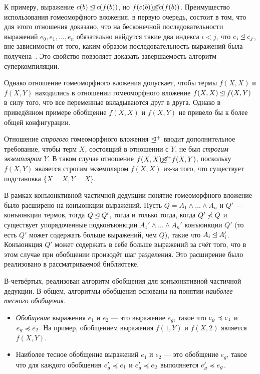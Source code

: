 К примеру, выражение $c(b) \unlhd c(f(b))$, но $f(c(b)) \cancel{\unlhd} c(f(b))$.
Преимущество использования гомеоморфного вложения, в первую очередь, состоит в том,
что для этого отношения доказано, что на бесконечной последовательности выражений $e_0, e_1, \dots, e_n$
обязательно найдутся такие два индекса $i < j$, что $e_i \unlhd e_j$, вне зависимости
от того, каким образом последовательность выражений была получена~\cite{scPos}.
Это свойство повзоляет доказать завершаемость алгоритм суперкомпиляции.

Однако отношение гомеоморфного вложения допускает, чтобы термы $f(X, X)$ и $f(X, Y)$
находились в отношении гомеоморфного вложение $f(X, X) \unlhd f(X, Y)$ в силу того,
что все переменные вкладываются друг в друга. Однако в приведённом примере обобщение
$f(X, X)$ и $f(X, Y)$ не привело бы к более общей конфигурации.

Отношение \emph{строгого} гомеоморфного вложения $\unlhd^+$ вводит дополнительное
требование, чтобы терм $X$, состоящий в отношении с $Y$, не был \emph{строгим экземпляром} $Y$\cite{homeo}.
В таком случае отношение $f(X, X) \cancel{\unlhd}^+ f(X, Y)$, поскольку $f(X, Y)$ является строгим
экземпляром $f(X, X)$ из-за того, что существует подстановка $\{ X = X, Y = X \}$.

В рамках конъюнктивной частичной дедукции понятие гомеоморфного вложение было расширено на конъюнкции выражений.
Пусть $Q = A_1 \land \dots \land A_n$ и $Q'$ --- конъюнкции термов, тогда $Q \unlhd Q'$, тогда и только тогда,
когда $Q' \not\prec Q$ и существует упорядоченные подконъюнкции $A_1' \land \dots \land A_n'$
конъюнкции $Q'$ (то есть $Q'$ может содержать больше выражений, чем $Q$), такие что $A_i \unlhd A_i'$.
Конъюнкция $Q'$ может содержать в себе больше выражений за счёт того, что в этом случае при обобщении
произодёт шаг разделения. Это расширение было реализовано в рассматриваемой библиотеке.



В-четвёртых, реализован алгоритм обобщения для конъюнктивной частичной дедукции.
В общем, алгоритмы обобщения основаны на понятии \emph{наиболее тесного обобщения}.
\begin{itemize}
\item \emph{Обобщение} выражения $e_1$ и $e_2$ --- это выражение $e_g$, такое что
$e_g \preccurlyeq e_1$  и $e_g \preccurlyeq e_2$. На пример, обобщением выражения
$f(1, Y)$ и $f(X, 2)$ является $f(X, Y)$.
\item Наиболее тесное обобщение 
выражений $e_1$ и $e_2$ --- это обобщение $e_g$, такое что
для каждого обобщения $e_g' \preccurlyeq e_1$ и $e_g' \preccurlyeq e_2$ выполянется $e_g' \preccurlyeq e_g$\cite{scPos}.
\end{itemize}

